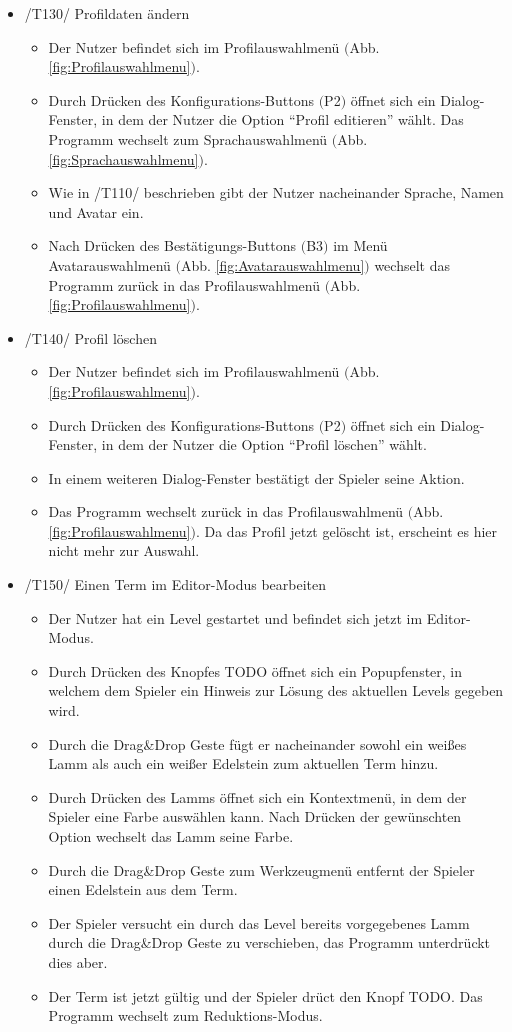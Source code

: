 \begin{itemize}
\item /T130/ Profildaten ändern
\begin{itemize}
\item Der Nutzer befindet sich im Profilauswahlmenü $($Abb. \ref{fig:Profilauswahlmenu}$)$.
\item Durch Drücken des Konfigurations-Buttons $($P2$)$ öffnet sich ein Dialog-Fenster, in dem der Nutzer die Option "`Profil editieren"' wählt. Das Programm wechselt zum Sprachauswahlmenü $($Abb. \ref{fig:Sprachauswahlmenu}$)$. 
\item Wie in /T110/ beschrieben gibt der Nutzer nacheinander Sprache, Namen und Avatar ein.
\item Nach Drücken des Bestätigungs-Buttons $($B3$)$ im Menü Avatarauswahlmenü $($Abb. \ref{fig:Avatarauswahlmenu}$)$ wechselt das Programm zurück in das Profilauswahlmenü $($Abb. \ref{fig:Profilauswahlmenu}$)$.
\end{itemize}

\item /T140/ Profil löschen
\begin{itemize}
\item Der Nutzer befindet sich im Profilauswahlmenü $($Abb. \ref{fig:Profilauswahlmenu}$)$.
\item Durch Drücken des Konfigurations-Buttons $($P2$)$ öffnet sich ein Dialog-Fenster, in dem der Nutzer die Option "`Profil löschen"' wählt.
\item In einem weiteren Dialog-Fenster bestätigt der Spieler seine Aktion.
\item Das Programm wechselt zurück in das Profilauswahlmenü $($Abb. \ref{fig:Profilauswahlmenu}$)$. Da das Profil jetzt gelöscht ist, erscheint es hier nicht mehr zur Auswahl.
\end{itemize}

\item /T150/ Einen Term im Editor-Modus bearbeiten
\begin{itemize}
\item Der Nutzer hat ein Level gestartet und befindet sich jetzt im Editor-Modus.
\item Durch Drücken des Knopfes TODO öffnet sich ein Popupfenster, in welchem dem Spieler ein Hinweis zur Lösung des aktuellen Levels gegeben wird.
\item Durch die Drag\&Drop Geste fügt er nacheinander sowohl ein weißes Lamm als auch ein weißer Edelstein zum aktuellen Term hinzu.
\item Durch Drücken des Lamms öffnet sich ein Kontextmenü, in dem der Spieler eine Farbe auswählen kann. Nach Drücken der gewünschten Option wechselt das Lamm seine Farbe.
\item Durch die Drag\&Drop Geste zum Werkzeugmenü entfernt der Spieler einen Edelstein aus dem Term.
\item Der Spieler versucht ein durch das Level bereits vorgegebenes Lamm durch die Drag\&Drop Geste zu verschieben, das Programm unterdrückt dies aber.
\item Der Term ist jetzt gültig und der Spieler drüct den Knopf TODO. Das Programm wechselt zum Reduktions-Modus.
\end{itemize}


\end{itemize}
